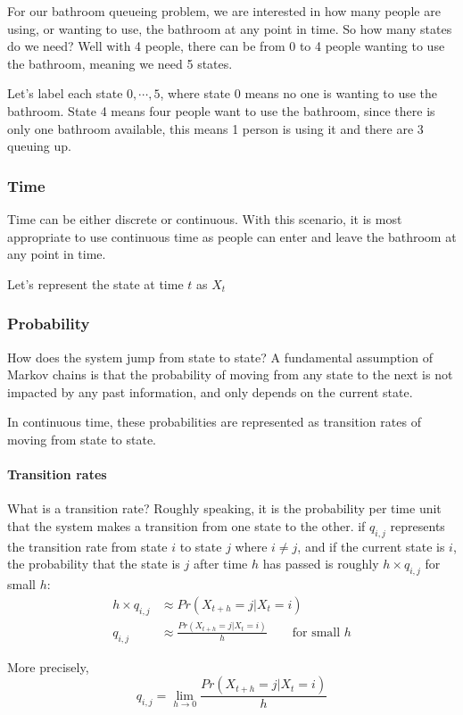 For our bathroom queueing problem, we are interested in how many people are using, or wanting to use, the bathroom at any point in time. So how many states do we need? Well with 4 people, there can be from 0 to 4 people wanting to use the bathroom, meaning we need 5 states. 

Let's label each state $0, \cdots, 5$, where state 0 means no one is wanting to use the bathroom. State 4 means four people want to use the bathroom, since there is only one bathroom available, this means 1 person is using it and there are 3 queuing up.

\subsubsection*{Time}
Time can be either discrete or continuous. With this scenario, it is most appropriate to use continuous time as people can enter and leave the bathroom at any point in time.

Let's represent the state at time $t$ as $X_t$

\subsubsection*{Probability}
How does the system jump from state to state? A fundamental assumption of Markov chains is that the probability of moving from any state to the next is not impacted by any past information, and only depends on the current state.

In continuous time, these probabilities are represented as transition rates of moving from state to state.

\paragraph{Transition rates}
What is a transition rate? Roughly speaking, it is the probability per time unit that the system makes a transition from one state to the other. 
if $q_{i,j}$ represents the transition rate from state $i$ to state $j$ where $i\neq j$, and if the current state is $i$, the probability that the state is $j$ after time $h$ has passed is roughly $h\times q_{i,j}$ for small $h$:
\begin{align*}
h\times q_{i,j} &\approx Pr(X_{t+h} = j|X_t = i)\\
q_{i, j} &\approx \frac{Pr(X_{t+h} = j|X_t = i)}{h} \qquad \text{for small } h
\end{align*}


More precisely,
$$ q_{i,j} = \lim_{h\rightarrow0}\frac{Pr(X_{t+h} = j | X_t = i)}{h} $$

